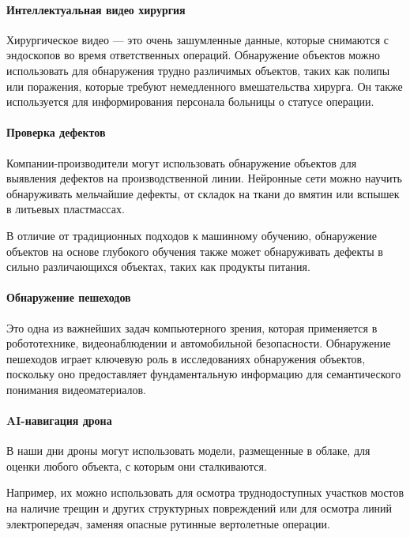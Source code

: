 \paragraph{Интеллектуальная видео хирургия}
Хирургическое видео — это очень зашумленные данные, которые снимаются с эндоскопов во время ответственных операций. Обнаружение объектов можно использовать для обнаружения трудно различимых объектов, таких как полипы или поражения, которые требуют немедленного вмешательства хирурга. Он также используется для информирования персонала больницы о статусе операции.

\paragraph{Проверка дефектов}
Компании-производители могут использовать обнаружение объектов для выявления дефектов на производственной линии. Нейронные сети можно научить обнаруживать мельчайшие дефекты, от складок на ткани до вмятин или вспышек в литьевых пластмассах.

В отличие от традиционных подходов к машинному обучению, обнаружение объектов на основе глубокого обучения также может обнаруживать дефекты в сильно различающихся объектах, таких как продукты питания.

\paragraph{Обнаружение пешеходов}
Это одна из важнейших задач компьютерного зрения, которая применяется в робототехнике, видеонаблюдении и автомобильной безопасности. Обнаружение пешеходов играет ключевую роль в исследованиях обнаружения объектов, поскольку оно предоставляет фундаментальную информацию для семантического понимания видеоматериалов.

\paragraph{AI-навигация дрона}
В наши дни дроны могут использовать модели, размещенные в облаке, для оценки любого объекта, с которым они сталкиваются.

Например, их можно использовать для осмотра труднодоступных участков мостов на наличие трещин и других структурных повреждений или для осмотра линий электропередач, заменяя опасные рутинные вертолетные операции.
